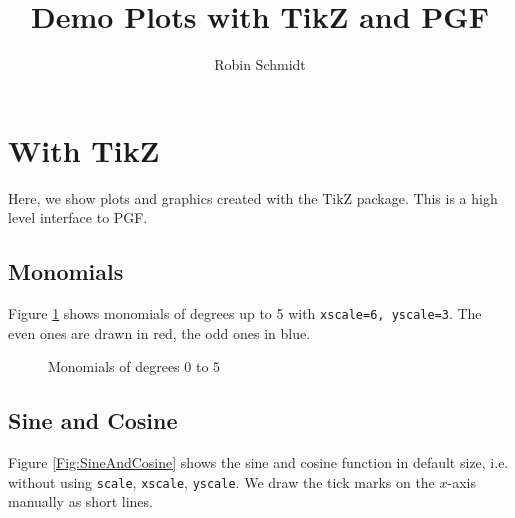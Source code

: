 



\title{Demo Plots with TikZ and PGF}
\author{Robin Schmidt}
\maketitle

\section{With TikZ}
Here, we show plots and graphics created with the TikZ package. This is a high level interface to PGF.

\subsection{Monomials}
Figure \ref{Fig:Monomials} shows monomials of degrees up to 5 with \verb|xscale=6, yscale=3|. The even ones are drawn in red, the odd ones in blue.

\begin{figure}[h]
\centering
\caption{Monomials of degrees $0$ to $5$}
\label{Fig:Monomials}
\pgfplotsset{width=8cm} 

\end{figure}

\subsection{Sine and Cosine}
Figure \ref{Fig:SineAndCosine} shows the sine and cosine function in default size, i.e. without using \verb|scale|, \verb|xscale|, \verb|yscale|. We draw the tick marks on the $x$-axis manually as short lines.

